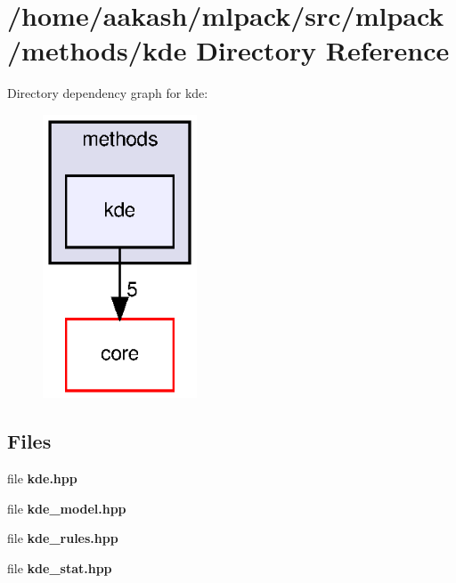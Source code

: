 \section{/home/aakash/mlpack/src/mlpack/methods/kde Directory Reference}
\label{dir_1f453a961caed1a150217c36fa70e3d4}
Directory dependency graph for kde\+:
\nopagebreak
\begin{figure}[H]
\begin{center}
\leavevmode
\includegraphics[width=130pt]{dir_1f453a961caed1a150217c36fa70e3d4_dep}
\end{center}
\end{figure}
\subsection*{Files}
\begin{DoxyCompactItemize}
\item 
file \textbf{ kde.\+hpp}
\item 
file \textbf{ kde\+\_\+model.\+hpp}
\item 
file \textbf{ kde\+\_\+rules.\+hpp}
\item 
file \textbf{ kde\+\_\+stat.\+hpp}
\end{DoxyCompactItemize}
